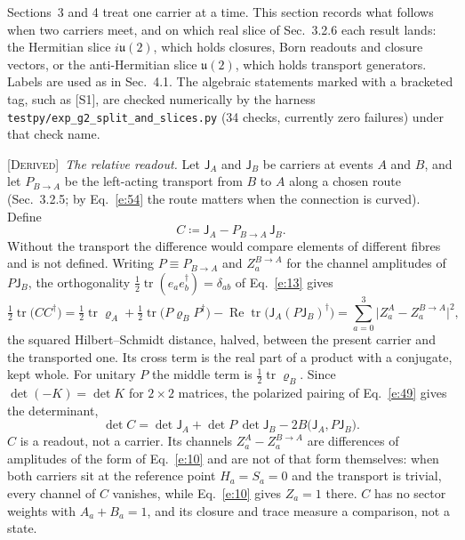 \documentclass[10pt]{article}
\newcommand{\sJ}{\mathsf{J}}
\newcommand{\tr}{\operatorname{tr}}
\DeclareMathOperator{\Real}{Re}
\newcommand{\Derived}{\noindent\textsc{[Derived]}\ }
\begin{document}
Sections~3 and 4 treat one carrier at a time. This section records what follows when two carriers meet, and on which real slice of Sec.~3.2.6 each result lands: the Hermitian slice $i\mathfrak u(2)$, which holds closures, Born readouts and closure vectors, or the anti-Hermitian slice $\mathfrak u(2)$, which holds transport generators. Labels are used as in Sec.~4.1. The algebraic statements marked with a bracketed tag, such as [S1], are checked numerically by the harness \texttt{testpy/exp\_g2\_split\_and\_slices.py} (34 checks, currently zero failures) under that check name.

\smallskip
\Derived \textit{The relative readout.} Let $\sJ_A$ and $\sJ_B$ be carriers at events $A$ and $B$, and let $P_{B\to A}$ be the left-acting transport from $B$ to $A$ along a chosen route (Sec.~3.2.5; by Eq.~\eqref{e:54} the route matters when the connection is curved). Define
\begin{equation}
C\coloneqq\sJ_A-P_{B\to A}\,\sJ_B .\label{e:61}
\end{equation}
Without the transport the difference would compare elements of different fibres and is not defined. Writing $P\equiv P_{B\to A}$ and $Z^{B\to A}_a$ for the channel amplitudes of $P\sJ_B$, the orthogonality $\frac12\tr(e_ae_b^\dagger)=\delta_{ab}$ of Eq.~\eqref{e:13} gives
\begin{equation}
\tfrac12\tr\bigl(CC^\dagger\bigr)=\tfrac12\tr\varrho_A+\tfrac12\tr\bigl(P\varrho_BP^\dagger\bigr)-\Real\tr\bigl(\sJ_A(P\sJ_B)^\dagger\bigr)=\sum_{a=0}^{3}\bigl|Z^A_a-Z^{B\to A}_a\bigr|^2,\label{e:62}
\end{equation}
the squared Hilbert--Schmidt distance, halved, between the present carrier and the transported one. Its cross term is the real part of a product with a conjugate, kept whole. For unitary $P$ the middle term is $\frac12\tr\varrho_B$. Since $\det(-K)=\det K$ for $2\times2$ matrices, the polarized pairing of Eq.~\eqref{e:49} gives the determinant,
\begin{equation}
\det C=\det\sJ_A+\det P\,\det\sJ_B-2B\bigl(\sJ_A,P\sJ_B\bigr).\label{e:63}
\end{equation}
$C$ is a readout, not a carrier. Its channels $Z^A_a-Z^{B\to A}_a$ are differences of amplitudes of the form of Eq.~\eqref{e:10} and are not of that form themselves: when both carriers sit at the reference point $H_a=S_a=0$ and the transport is trivial, every channel of $C$ vanishes, while Eq.~\eqref{e:10} gives $Z_a=1$ there. $C$ has no sector weights with $A_a+B_a=1$, and its closure and trace measure a comparison, not a state.
\end{document}
